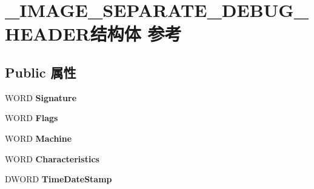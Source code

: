 \hypertarget{struct___i_m_a_g_e___s_e_p_a_r_a_t_e___d_e_b_u_g___h_e_a_d_e_r}{}\section{\+\_\+\+I\+M\+A\+G\+E\+\_\+\+S\+E\+P\+A\+R\+A\+T\+E\+\_\+\+D\+E\+B\+U\+G\+\_\+\+H\+E\+A\+D\+E\+R结构体 参考}
\label{struct___i_m_a_g_e___s_e_p_a_r_a_t_e___d_e_b_u_g___h_e_a_d_e_r}
\subsection*{Public 属性}
\begin{DoxyCompactItemize}
\item 
\mbox{\label{struct___i_m_a_g_e___s_e_p_a_r_a_t_e___d_e_b_u_g___h_e_a_d_e_r_aadfb30ae68abf05d0914068a4f81df88}} 
W\+O\+RD {\bfseries Signature}
\item 
\mbox{\label{struct___i_m_a_g_e___s_e_p_a_r_a_t_e___d_e_b_u_g___h_e_a_d_e_r_aa5b035edf171d493dcb2843b721afdcb}} 
W\+O\+RD {\bfseries Flags}
\item 
\mbox{\label{struct___i_m_a_g_e___s_e_p_a_r_a_t_e___d_e_b_u_g___h_e_a_d_e_r_a805db4e2669e4e9a020cb42f0c64e998}} 
W\+O\+RD {\bfseries Machine}
\item 
\mbox{\label{struct___i_m_a_g_e___s_e_p_a_r_a_t_e___d_e_b_u_g___h_e_a_d_e_r_a069cb6bd7dc7ff2555b6a0d33293bfcc}} 
W\+O\+RD {\bfseries Characteristics}
\item 
\mbox{\label{struct___i_m_a_g_e___s_e_p_a_r_a_t_e___d_e_b_u_g___h_e_a_d_e_r_aa6e5e4d6b597e798882abe689f3d4430}} 
D\+W\+O\+RD {\bfseries Time\+Date\+Stamp}
\item 
\mbox{\label{struct___i_m_a_g_e___s_e_p_a_r_a_t_e___d_e_b_u_g___h_e_a_d_e_r_a40f652f52f2df06511dde4943a4f7ced}} 

\end{DoxyCompactItemize}
